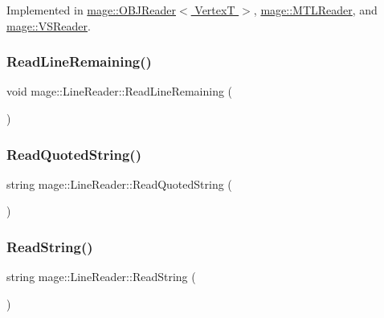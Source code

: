 Implemented in \hyperlink{classmage_1_1_o_b_j_reader_a66080ff8e84d61c421e455ae9bf63414}{mage\+::\+O\+B\+J\+Reader$<$ Vertex\+T $>$}, \hyperlink{classmage_1_1_m_t_l_reader_a884a333063f7682f4238bdebf340d0a3}{mage\+::\+M\+T\+L\+Reader}, and \hyperlink{classmage_1_1_v_s_reader_a63c6f6fa8ddb0f6a001e3969c5b19c1f}{mage\+::\+V\+S\+Reader}.

\hypertarget{classmage_1_1_line_reader_a3a4b99bfef1e8a826d74a01bcc663fcb}{}\label{classmage_1_1_line_reader_a3a4b99bfef1e8a826d74a01bcc663fcb} 
\subsubsection{\texorpdfstring{Read\+Line\+Remaining()}{ReadLineRemaining()}}
{\footnotesize\ttfamily void mage\+::\+Line\+Reader\+::\+Read\+Line\+Remaining (\begin{DoxyParamCaption}{ }\end{DoxyParamCaption})\hspace{0.3cm}{\ttfamily [protected]}}

\hypertarget{classmage_1_1_line_reader_ae5495a5fd889d91badab15f10186e370}{}\label{classmage_1_1_line_reader_ae5495a5fd889d91badab15f10186e370} 
\subsubsection{\texorpdfstring{Read\+Quoted\+String()}{ReadQuotedString()}}
{\footnotesize\ttfamily string mage\+::\+Line\+Reader\+::\+Read\+Quoted\+String (\begin{DoxyParamCaption}{ }\end{DoxyParamCaption})\hspace{0.3cm}{\ttfamily [protected]}}

\hypertarget{classmage_1_1_line_reader_a51050682b0c06a36b0075beba0274b89}{}\label{classmage_1_1_line_reader_a51050682b0c06a36b0075beba0274b89} 
\subsubsection{\texorpdfstring{Read\+String()}{ReadString()}}
{\footnotesize\ttfamily string mage\+::\+Line\+Reader\+::\+Read\+String (\begin{DoxyParamCaption}{ }\end{DoxyParamCaption})\hspace{0.3cm}{\ttfamily [protected]}}

